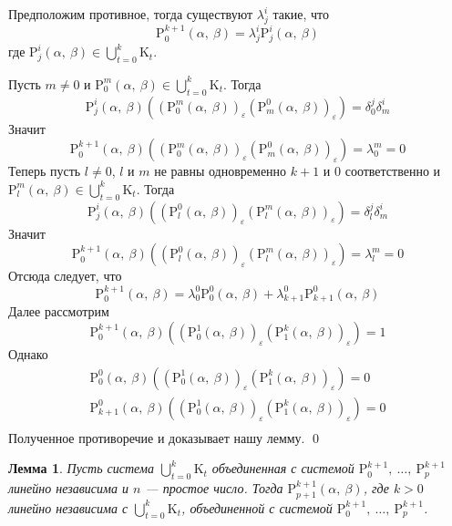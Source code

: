 \documentclass[12pt, reqno, a4paper, oneside, notitlepage]{amsart}
\makeatletter
\theoremstyle{mytheoremstyle}
\newtheorem{lemma}[theorem]{Лемма}
\theoremstyle{myremarkstyle}
\numberwithin{equation}{section}
\renewenvironment{proof}[1][\proofname]{\par\indent {\bfseries #1\@addpunct{.} }}{\qed}
\makeatother
\begin{document}
\begin{proof}
  Предположим противное, тогда существуют $\lambda^i_j$ такие, что 
  \[
	\mathrm{P}^{k+1}_0(\alpha,\ \beta) = \lambda^i_j\mathrm{P}^{i}_j(\alpha,\ \beta)
  \]
  где $\mathrm{P}^{i}_j(\alpha,\ \beta) \in \bigcup\limits_{t = 0}^k\mathrm{K}_t$.

  Пусть $m \neq 0$ и $\mathrm{P}^{m}_0(\alpha,\ \beta) \in \bigcup\limits_{t = 0}^k\mathrm{K}_t$.
  Тогда \[
	\mathrm{P}^{i}_j(\alpha,\ \beta)\left(\left(\mathrm{P}^m_0(\alpha,\ \beta)\right)_\varepsilon\left(\mathrm{P}^0_m(\alpha,\ \beta)\right)_\varepsilon\right)  = 
	\delta^j_0\delta^i_m
  \]
  Значит  \[
	\mathrm{P}^{k+1}_0(\alpha,\ \beta)\left(\left(\mathrm{P}^m_0(\alpha,\ \beta)\right)_\varepsilon\left(\mathrm{P}^0_m(\alpha,\ \beta)\right)_\varepsilon\right) = \lambda^m_0 = 0
  \]
  Теперь пусть $l \neq 0$, $l$ и $m$ не равны одновременно $k+1$ и $0$ соответственно и $\mathrm{P}^{m}_l(\alpha,\ \beta) \in \bigcup\limits_{t = 0}^k\mathrm{K}_t$.
  Тогда \[
	\mathrm{P}^{i}_j(\alpha,\ \beta)\left(\left(\mathrm{P}^0_l(\alpha,\ \beta)\right)_\varepsilon\left(\mathrm{P}^m_l(\alpha,\ \beta)\right)_\varepsilon\right)  = \delta^j_l\delta^i_m
  \]
  Значит  \[
	\mathrm{P}^{k+1}_0(\alpha,\ \beta)\left(\left(\mathrm{P}^0_l(\alpha,\ \beta)\right)_\varepsilon\left(\mathrm{P}^m_l(\alpha,\ \beta)\right)_\varepsilon\right) = \lambda^m_l = 0
  \]
  Отсюда следует, что 
  \[
	\mathrm{P}^{k+1}_0(\alpha,\ \beta) = \lambda^0_0\mathrm{P}^0_0(\alpha,\ \beta) + \lambda^0_{k+1}\mathrm{P}^0_{k+1}(\alpha,\ \beta)
  \]
  Далее рассмотрим 
  \[
	\mathrm{P}^{k+1}_0(\alpha,\ \beta)\left(\left(\mathrm{P}^1_0(\alpha,\ \beta)\right)_\varepsilon\left(\mathrm{P}^k_1(\alpha,\ \beta)\right)_\varepsilon\right) = 1
  \]
  Однако 
  \begin{eqnarray*}
	\mathrm{P}^0_0(\alpha,\ \beta)\left(\left(\mathrm{P}^1_0(\alpha,\ \beta)\right)_\varepsilon\left(\mathrm{P}^k_1(\alpha,\ \beta)\right)_\varepsilon\right) = 0\\
	\mathrm{P}^0_{k+1}(\alpha,\ \beta)\left(\left(\mathrm{P}^1_0(\alpha,\ \beta)\right)_\varepsilon\left(\mathrm{P}^k_1(\alpha,\ \beta)\right)_\varepsilon\right) = 0\\
  \end{eqnarray*}
  Полученное противоречие и доказывает нашу лемму.
\end{proof}

\begin{lemma} \label{support2}
  Пусть система $\bigcup\limits_{t = 0}^k\mathrm{K}_t$ объединенная с системой $\mathrm{P}^{k+1}_0,\ \dots,\ \mathrm{P}^{k+1}_p$ линейно независима и $n$ --- простое число. Тогда $\mathrm{P}^{k+1}_{p+1}(\alpha,\ \beta)$, где $k >0$ линейно независима с $\bigcup\limits_{t = 0}^k\mathrm{K}_t$, объединенной с системой $\mathrm{P}^{k+1}_0,\ \dots,\ \mathrm{P}^{k+1}_p$.
\end{lemma}
\end{document}
